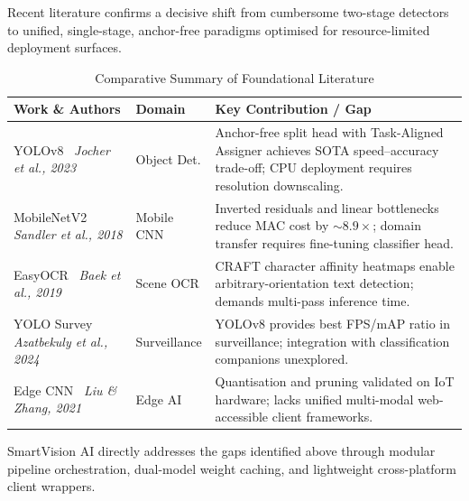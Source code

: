 \documentclass[conference]{IEEEtran}
\begin{document}
Recent literature confirms a decisive shift from cumbersome two-stage detectors
to unified, single-stage, anchor-free paradigms optimised for resource-limited
deployment surfaces.

\begin{table}[htbp]
\caption{Comparative Summary of Foundational Literature}
\label{tab:lit}
\centering
\small
\begin{tabularx}{\columnwidth}{>{\raggedright}p{2.0cm} >{\raggedright}p{1.2cm} X}
\toprule
\textbf{Work \& Authors} & \textbf{Domain} & \textbf{Key Contribution / Gap} \\
\midrule
YOLOv8~\cite{yolov8} \newline \textit{Jocher et al., 2023} &
  Object Det. &
  Anchor-free split head with Task-Aligned Assigner achieves SOTA speed–accuracy
  trade-off; CPU deployment requires resolution downscaling. \\
\addlinespace
MobileNetV2~\cite{mobilenetv2} \newline \textit{Sandler et al., 2018} &
  Mobile CNN &
  Inverted residuals and linear bottlenecks reduce MAC cost by $\sim\!8.9\times$;
  domain transfer requires fine-tuning classifier head. \\
\addlinespace
EasyOCR~\cite{craft} \newline \textit{Baek et al., 2019} &
  Scene OCR &
  CRAFT character affinity heatmaps enable arbitrary-orientation text detection;
  demands multi-pass inference time. \\
\addlinespace
YOLO Survey~\cite{azatbekuly} \newline \textit{Azatbekuly et al., 2024} &
  Surveillance &
  YOLOv8 provides best FPS/mAP ratio in surveillance; integration with
  classification companions unexplored. \\
\addlinespace
Edge CNN~\cite{edgecnn} \newline \textit{Liu \& Zhang, 2021} &
  Edge AI &
  Quantisation and pruning validated on IoT hardware; lacks unified multi-modal
  web-accessible client frameworks. \\
\bottomrule
\end{tabularx}
\end{table}

SmartVision AI directly addresses the gaps identified above through modular
pipeline orchestration, dual-model weight caching, and lightweight cross-platform
client wrappers.

\end{document}
